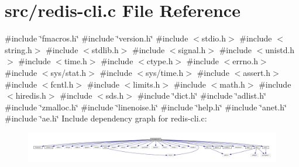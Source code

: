 \hypertarget{redis-cli_8c}{}\section{src/redis-\/cli.c File Reference}
\label{redis-cli_8c}
{\ttfamily \#include \char`\"{}fmacros.\+h\char`\"{}}\newline
{\ttfamily \#include \char`\"{}version.\+h\char`\"{}}\newline
{\ttfamily \#include $<$stdio.\+h$>$}\newline
{\ttfamily \#include $<$string.\+h$>$}\newline
{\ttfamily \#include $<$stdlib.\+h$>$}\newline
{\ttfamily \#include $<$signal.\+h$>$}\newline
{\ttfamily \#include $<$unistd.\+h$>$}\newline
{\ttfamily \#include $<$time.\+h$>$}\newline
{\ttfamily \#include $<$ctype.\+h$>$}\newline
{\ttfamily \#include $<$errno.\+h$>$}\newline
{\ttfamily \#include $<$sys/stat.\+h$>$}\newline
{\ttfamily \#include $<$sys/time.\+h$>$}\newline
{\ttfamily \#include $<$assert.\+h$>$}\newline
{\ttfamily \#include $<$fcntl.\+h$>$}\newline
{\ttfamily \#include $<$limits.\+h$>$}\newline
{\ttfamily \#include $<$math.\+h$>$}\newline
{\ttfamily \#include $<$hiredis.\+h$>$}\newline
{\ttfamily \#include $<$sds.\+h$>$}\newline
{\ttfamily \#include \char`\"{}dict.\+h\char`\"{}}\newline
{\ttfamily \#include \char`\"{}adlist.\+h\char`\"{}}\newline
{\ttfamily \#include \char`\"{}zmalloc.\+h\char`\"{}}\newline
{\ttfamily \#include \char`\"{}linenoise.\+h\char`\"{}}\newline
{\ttfamily \#include \char`\"{}help.\+h\char`\"{}}\newline
{\ttfamily \#include \char`\"{}anet.\+h\char`\"{}}\newline
{\ttfamily \#include \char`\"{}ae.\+h\char`\"{}}\newline
Include dependency graph for redis-\/cli.c\+:
\nopagebreak
\begin{figure}[H]
\begin{center}
\leavevmode
\includegraphics[width=350pt]{redis-cli_8c__incl}
\end{center}
\end{figure}
